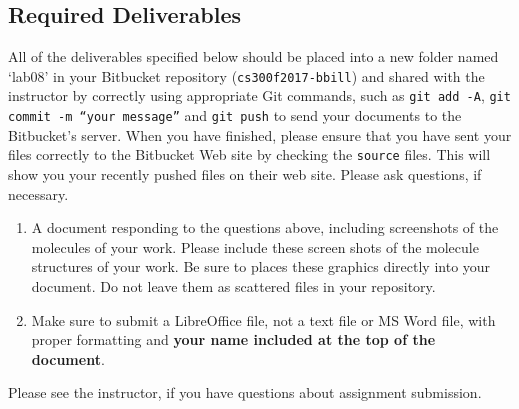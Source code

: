 \vspace*{-.1in}
\subsection*{Required Deliverables}
\vspace*{-.1in}
All of the deliverables specified below should be placed into a new folder named `lab08' in your Bitbucket repository ({\tt cs300f2017-bbill})  and shared with the instructor by correctly using  appropriate Git commands, such as {\tt git add -A}, {\tt git commit -m ``your message''} and {\tt git push} to send your documents to the Bitbucket's server. When you have finished, please ensure that you have sent your files correctly to the Bitbucket Web site by checking the {\tt source} files. This will show you your recently pushed files on their web site. Please ask questions, if necessary.
\color{red}
\begin{enumerate}
	\item A document responding to the questions above, including screenshots of the molecules of your work. Please include these screen shots of the molecule structures of your work. Be sure to places these graphics directly into your document. Do not leave them as scattered files in your repository.
	\item Make sure to submit a LibreOffice file, not a text file or MS Word file, with proper formatting and \textbf{your name included at the top of the document}.
\end{enumerate}
\color{black}

\noindent Please see the instructor, if you have questions about assignment submission.




